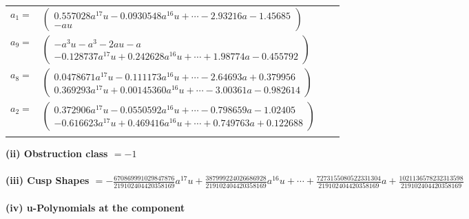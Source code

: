 \documentclass[1p]{elsarticle_modified}
\theoremstyle{definition}
\begin{document}
\begin{tabular}{m{7pt} m{180pt} m{7pt} m{180pt} }
\flushright $a_{1}=$&$\begin{pmatrix}0.557028 a^{17} u-0.0930548 a^{16} u+\cdots-2.93216 a-1.45685\\- a u\end{pmatrix}$ \\
\flushright $a_{9}=$&$\begin{pmatrix}- a^3 u- a^3-2 a u- a\\-0.128737 a^{17} u+0.242628 a^{16} u+\cdots+1.98774 a-0.455792\end{pmatrix}$ \\
\flushright $a_{8}=$&$\begin{pmatrix}0.0478671 a^{17} u-0.111173 a^{16} u+\cdots-2.64693 a+0.379956\\0.369293 a^{17} u+0.00145360 a^{16} u+\cdots-3.00361 a-0.982614\end{pmatrix}$ \\
\flushright $a_{2}=$&$\begin{pmatrix}0.372906 a^{17} u-0.0550592 a^{16} u+\cdots-0.798659 a-1.02405\\-0.616623 a^{17} u+0.469416 a^{16} u+\cdots+0.749763 a+0.122688\end{pmatrix}$\\&\end{tabular}
\flushleft \textbf{(ii) Obstruction class $= -1$}\\~\\
\flushleft \textbf{(iii) Cusp Shapes $= -\frac{670869991029847876}{219102404420358169} a^{17} u+\frac{387999224026686928}{219102404420358169} a^{16} u+\cdots+\frac{7273155080522331304}{219102404420358169} a+\frac{1021136578232313598}{219102404420358169}$}\\~\\
\newpage\renewcommand{\arraystretch}{1}
\flushleft \textbf{(iv) u-Polynomials at the component}\newline \\
\end{document}
